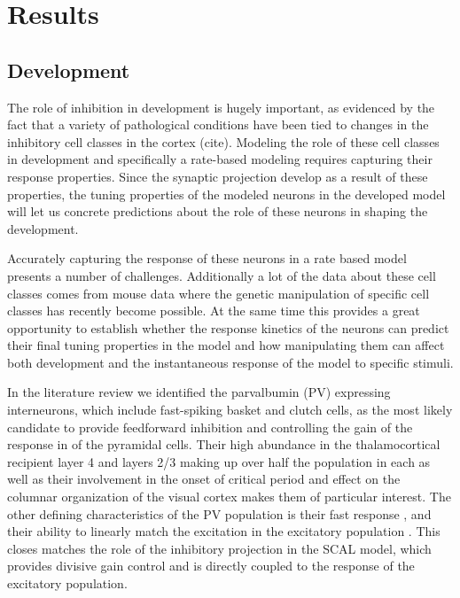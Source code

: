 \section{Results}

\subsection{Development}

The role of inhibition in development is hugely important, as
evidenced by the fact that a variety of pathological conditions have
been tied to changes in the inhibitory cell classes in the cortex
(cite). Modeling the role of these cell classes in development and
specifically a rate-based modeling requires capturing their response
properties. Since the synaptic projection develop as a result of these
properties, the tuning properties of the modeled neurons in the
developed model will let us concrete predictions about the role of
these neurons in shaping the development.

Accurately capturing the response of these neurons in a rate based
model presents a number of challenges. Additionally a lot of the data
about these cell classes comes from mouse data where the genetic
manipulation of specific cell classes has recently become possible. At
the same time this provides a great opportunity to establish whether
the response kinetics of the neurons can predict their final tuning
properties in the model and how manipulating them can affect both
development and the instantaneous response of the model to specific
stimuli.

In the literature review we identified the parvalbumin (PV) expressing
interneurons, which include fast-spiking basket and clutch cells, as
the most likely candidate to provide feedforward inhibition and
controlling the gain of the response in of the pyramidal cells. Their
high abundance in the thalamocortical recipient layer 4 and layers 2/3
making up over half the population in each \citep{VanBrederode1990} as
well as their involvement in the onset of critical period
\citep{Fagiolini2000} and effect on the columnar organization of the
visual cortex \citep{Hensch2004} makes them of particular interest. The
other defining characteristics of the PV population is their fast
response \citep{Cruikshank2007,Gabernet2005}, and their ability to
linearly match the excitation in the excitatory population
\citep{Atallah2012}. This closes matches the role of the inhibitory
projection in the SCAL model, which provides divisive gain control and
is directly coupled to the response of the excitatory population.

